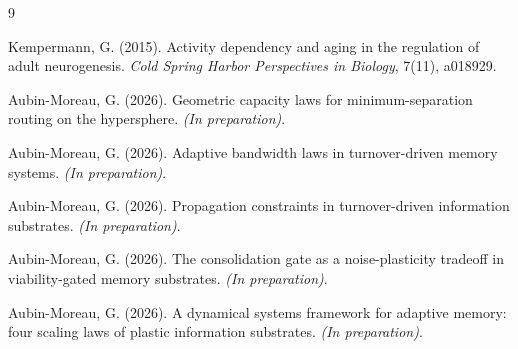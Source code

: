 \documentclass[11pt,twocolumn]{article}
\begin{document}
\begin{thebibliography}{9}

Kempermann, G. (2015).
Activity dependency and aging in the regulation of adult neurogenesis.
\emph{Cold Spring Harbor Perspectives in Biology}, 7(11), a018929.

Aubin-Moreau, G. (2026).
Geometric capacity laws for minimum-separation routing on the hypersphere.
\emph{(In preparation)}.

Aubin-Moreau, G. (2026).
Adaptive bandwidth laws in turnover-driven memory systems.
\emph{(In preparation)}.

Aubin-Moreau, G. (2026).
Propagation constraints in turnover-driven information substrates.
\emph{(In preparation)}.

Aubin-Moreau, G. (2026).
The consolidation gate as a noise-plasticity tradeoff in viability-gated memory substrates.
\emph{(In preparation)}.

Aubin-Moreau, G. (2026).
A dynamical systems framework for adaptive memory: four scaling laws of plastic information substrates.
\emph{(In preparation)}.

\end{thebibliography}
\end{document}
